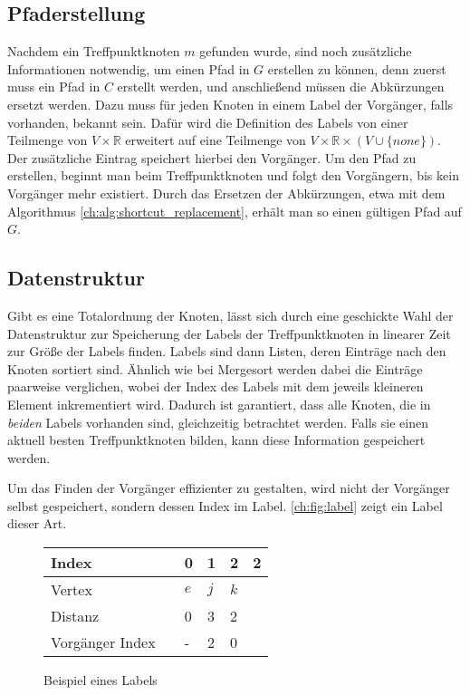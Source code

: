 \subsection{Pfaderstellung}

Nachdem ein Treffpunktknoten $m$ gefunden wurde, sind noch zusätzliche Informationen notwendig, um einen Pfad in $G$ erstellen zu können, denn zuerst muss ein Pfad in $C$ erstellt werden, und anschließend müssen die Abkürzungen ersetzt werden.
Dazu muss für jeden Knoten in einem Label der Vorgänger, falls vorhanden, bekannt sein.
Dafür wird die Definition des Labels von einer Teilmenge von $V \times \mathbb{R}$ erweitert auf eine Teilmenge von $V \times \mathbb{R} \times (V \cup \{ none \}) $.
Der zusätzliche Eintrag speichert hierbei den Vorgänger.
Um den Pfad zu erstellen, beginnt man beim Treffpunktknoten und folgt den Vorgängern, bis kein Vorgänger mehr existiert.
Durch das Ersetzen der Abkürzungen, etwa mit dem Algorithmus \ref{ch:alg:shortcut_replacement}, erhält man so einen gültigen Pfad auf $G$.

\subsection{Datenstruktur}

Gibt es eine Totalordnung der Knoten, lässt sich durch eine geschickte Wahl der Datenstruktur zur Speicherung der Labels der Treffpunktknoten in linearer Zeit zur Größe der Labels finden.
Labels sind dann Listen, deren Einträge nach den Knoten sortiert sind.
Ähnlich wie bei Mergesort werden dabei die Einträge paarweise verglichen, wobei der Index des Labels mit dem jeweils kleineren Element inkrementiert wird.
Dadurch ist garantiert, dass alle Knoten, die in \emph{beiden} Labels vorhanden sind, gleichzeitig betrachtet werden.
Falls sie einen aktuell besten Treffpunktknoten bilden, kann diese Information gespeichert werden.

Um das Finden der Vorgänger effizienter zu gestalten, wird nicht der Vorgänger selbst gespeichert, sondern dessen Index im Label.
\autoref{ch:fig:label} zeigt ein Label dieser Art.

\begin{figure}[ht]
  \centering
  \begin{tabular}{@{}llllll@{}}
    \toprule
    Index           &  & 0   & 1   & 2   & 2 \\ \midrule
    Vertex          &  & $e$ & $j$ & $k$ &   \\
    Distanz         &  & 0   & 3   & 2   &   \\
    Vorgänger Index &  & -   & 2   & 0   &   \\ \bottomrule
  \end{tabular}
  \caption{Beispiel eines Labels}
  \label{ch:fig:label}
\end{figure}

